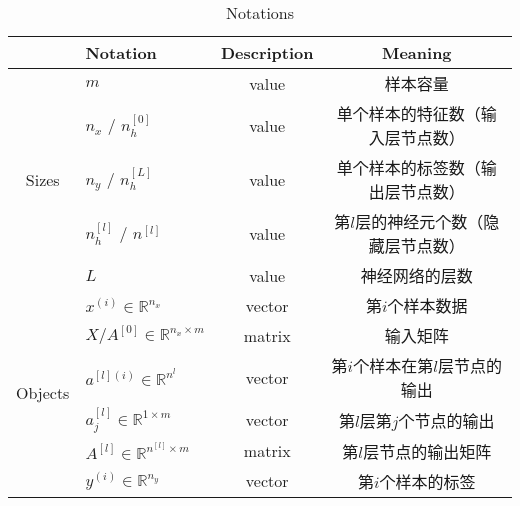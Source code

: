 \begin{table}[ht]
	\centering
	\begin{threeparttable}
	\caption{Notations}
	\begin{tabular}{clcc}
		\hline
									& \textbf{Notation}                                     & \textbf{Description} & \textbf{Meaning}                                                   \\ \hline
		\multirow{5}{*}{Sizes}      & $m$                                                   & value                & 样本容量                                                               \\
									& $n_x$ / $n_h^{[0]}$                                   & value                & 单个样本的特征数（输入层节点数）                                         \\
									& $n_y$ / $n_h^{[L]}$                                   & value                & 单个样本的标签数（输出层节点数）                                      \\
									& $n_h^{[l]}$ / $n^{[l]}$                               & value                & 第$l$层的神经元个数（隐藏层节点数）                                   \\
									& $L$                                                   & value                & 神经网络的层数                                                         \\ \hline
		\multirow{11}{*}{Objects}   & $x^{(i)} \in \mathbb{R}^{n_x}$                        & vector               & 第$i$个样本数据                                                          \\
									& $X / A^{[0]} \in {\mathbb{R}^{n_x \times m}}$         & matrix               & 输入矩阵                                                               \\
									& $a^{[l](i)} \in \mathbb{R}^{n^{l}}$                   & vector               & 第$i$个样本在第$l$层节点的输出                                                  \\
									& $a_j^{[l]} \in \mathbb{R}^{1 \times {m}}$             & vector               & 第$l$层第$j$个节点的输出                                                         \\
									& $A^{[l]} \in \mathbb{R}^{n^{[l]} \times {m}}$         & matrix               & 第$l$层节点的输出矩阵                                                         \\
									& $y^{(i)} \in \mathbb{R}^{n_y}$                        & vector               & 第$i$个样本的标签                                                         \\

\end{tabular}
\end{threeparttable}
\end{table}
